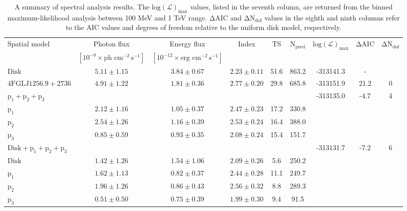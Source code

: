 \documentclass[fleqn,usenatbib]{mnras}
\begin{document}
\begin{table*}
\caption{A summary of spectral analysis results. The $\mathrm{log(\mathcal{L})_{max}}$ values, listed in the seventh column, are returned from the binned maximum-likelihood analysis between 100 MeV and 1 TeV range. $\mathrm{\Delta AIC}$ and $\mathrm{\Delta N_{dof}}$ values in the eighth and ninth columns refer to the AIC values and degrees of freedom relative to the uniform disk model, respectively.}
\centering
\label{tab:table2}
\begin{tabular}{lcccccccc}
    \hline
    Spatial model & Photon flux & Energy flux & Index & TS & $\mathrm{N_{pred}}$ & $\mathrm{log(\mathcal{L})_{max}}$ & $\mathrm{\Delta AIC}$ & $\mathrm{\Delta N_{dof}}$ \vspace{1mm}\\
  & $\mathrm{[10^{-9} \times ph \,\, cm^{-2} \, s^{-1}]}$ & $\mathrm{[10^{-12} \times erg \,\, cm^{-2} \, s^{-1}]}$ & & & & & \\
    \hline
    \textbf{$\boldsymbol{\mathrm{Disk}}$} & $5.11\pm1.15$ & $3.84\pm0.67$ & $2.23\pm0.11$ & 51.6 & 863.2 & -313141.3 & - &\vspace{1mm}\\
    \textbf{$\boldsymbol{\mathrm{4FGL J1256.9+2736}}$} & $4.91\pm1.22$ &  $1.81\pm0.36$ & $2.77\pm0.20$ & 29.8 & 685.8 & -313151.9 & 21.2 & 0\vspace{1mm}\\ 
    \textbf{$\boldsymbol{\mathrm{p_1+p_2+p_3}}$} &  &  &  &  &  & -313135.0 & -4.7 & 4\vspace{1mm}\\
    $\mathrm{p_1}$ & $2.12\pm1.16$ & $1.05\pm0.37$ & $2.47\pm0.23$ & 17.2 & 330.8  &  &  & \\
    $\mathrm{p_2}$ & $2.54\pm1.26$ &  $1.16\pm0.39$ & $2.53\pm0.24$ & 16.4 & 388.0 &  &  & \\
    $\mathrm{p_3}$ & $0.85\pm0.59$ &  $0.93\pm0.35$ & $2.08\pm0.24$ & 15.4 & 151.7 &  &  & \vspace{1mm}\\
    \textbf{$\boldsymbol{\mathrm{Disk+p_1+p_2+p_3}}$}  &  &  &  &  &  & -313131.7 & -7.2 & 6\\
    $\mathrm{Disk}$ & $1.42\pm1.26$ &  $1.54\pm1.06$ & $2.09\pm0.26$ & 5.6 & 250.2 &  &  &\\
    $\mathrm{p_1}$ & $1.62\pm1.13$ &  $0.82\pm0.37$ & $2.44\pm0.28$ & 11.1 & 249.7 &  &  & \\
    $\mathrm{p_2}$ & $1.96\pm1.26$ &  $0.86\pm0.43$ & $2.56\pm0.32$ & 8.8 & 289.3 &  &  & \\
    $\mathrm{p_3}$ & $0.51\pm0.50$ &  $0.75\pm0.39$ & $1.99\pm0.30$ & 9.4 & 91.5 &  &  & \\
    \hline
\end{tabular}
\end{table*}
\end{document}
